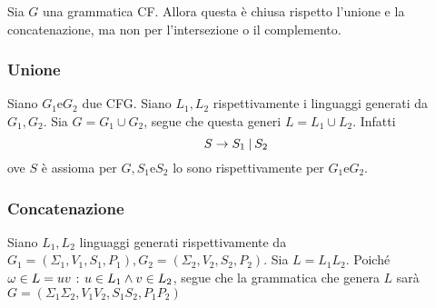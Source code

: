 \documentclass{subfiles}
\begin{document}
Sia \(G\) una grammatica CF. Allora questa è chiusa rispetto l'unione e la concatenazione, ma non per l'intersezione o il complemento.

\subsubsection{Unione}
Siano \(G_{1} \text{e} G_{2}\) due CFG.
\noindent Siano \(L_{1}, L_{2}\) rispettivamente i linguaggi generati da \(G_{1}, G_{2}\).
\noindent Sia \(G = G_{1} \cup G_{2}\), segue che questa generi \(L = L_{1} \cup L_{2}\). Infatti
\[
    S \to S_{1} \:{|}\: S_{2}
\]
ove \(S\) è assioma per \(G, S_{1} \text{e} S_{2}\) lo sono rispettivamente per \(G_{1} \text{e} G_{2}\).

\subsubsection{Concatenazione}
Siano \(L_{1}, L_{2}\) linguaggi generati rispettivamente da \(G_{1} = (\Sigma_{1}, V_{1}, S_{1}, P_{1}), G_{2} = (\Sigma_{2}, V_{2}, S_{2}, P_{2})\).
Sia \(L = L_{1}L_{2}\). Poiché \(\omega \in L = uv \operatorname{\: {:} \:} u \in L_{1} \land v \in L_{2}\),
segue che la grammatica che genera \(L\) sarà \(G = (\Sigma_{1}\Sigma_{2}, V_{1}V_{2}, S_{1}S_{2}, P_{1}P_{2})\)
\end{document}
